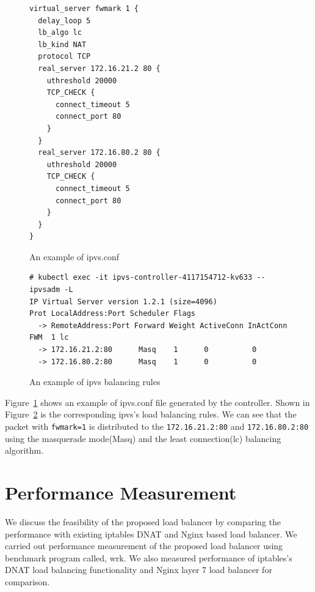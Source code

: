 \begin{figure}
\begin{minipage}{0.7\columnwidth}
\begin{verbatim}
virtual_server fwmark 1 {
  delay_loop 5
  lb_algo lc
  lb_kind NAT
  protocol TCP
  real_server 172.16.21.2 80 {
    uthreshold 20000
    TCP_CHECK {
      connect_timeout 5
      connect_port 80
    }
  }
  real_server 172.16.80.2 80 {
    uthreshold 20000
    TCP_CHECK {
      connect_timeout 5
      connect_port 80
    }
  }
}
\end{verbatim}
\end{minipage}
\caption{An example of ipvs.conf}
\label{fig:ipvs.conf}
\end{figure}

\begin{figure}
\begin{minipage}{\columnwidth}
\small
\begin{verbatim}
# kubectl exec -it ipvs-controller-4117154712-kv633 -- ipvsadm -L
IP Virtual Server version 1.2.1 (size=4096)
Prot LocalAddress:Port Scheduler Flags
  -> RemoteAddress:Port Forward Weight ActiveConn InActConn
FWM  1 lc
  -> 172.16.21.2:80      Masq    1      0          0         
  -> 172.16.80.2:80      Masq    1      0          0
\end{verbatim}
\end{minipage}
\caption{An example of ipvs balancing rules}
\label{fig:ipvs rule}
\end{figure}

Figure~\ref{fig:ipvs.conf} shows an example of ipvs.conf file generated by the controller. 
Shown in Figure~\ref{fig:ipvs rule} is the corresponding ipvs's load balancing rules.
We can see that the packet with {\tt fwmark=1}\cite{BertHubert2002} is distributed 
to the {\tt 172.16.21.2:80} and {\tt 172.16.80.2:80} 
using the masquerade mode(Masq) and 
the least connection(lc)\cite{Zhang2000} balancing algorithm.   


\section{Performance Measurement}\label{Performance Measurement}

We discuss the feasibility of the proposed load balancer by comparing the performance with existing iptables DNAT and Nginx based load balancer. 
We carried out performance measurement of the proposed load balancer using benchmark program called, wrk\cite{Glozer2016}.
We also measured performance of iptables's DNAT load balancing functionality and Nginx layer 7 load balancer for comparison.

